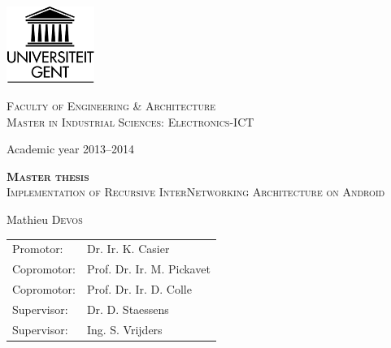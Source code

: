 
\begin{titlepage}

\fontsize{12pt}{14pt}\selectfont

\begin{center}

\includegraphics[height=2.5cm]{figures/ruglogo} 


\vspace{1.7cm}

\fontsize{14pt}{17pt}\selectfont
\textsc{Faculty of Engineering \& Architecture\\Master in Industrial Sciences: Electronics-ICT}
\fontsize{12pt}{14pt}\selectfont
\vspace{0.3cm}

\vspace{1.2cm}

Academic year 2013--2014

\vspace{2.8cm}


\fontsize{17.28pt}{21pt}\selectfont

{\textsc{\textbf{Master thesis}\\Implementation of Recursive InterNetworking Architecture on Android}}

\fontsize{12pt}{14pt}\selectfont

\vspace{2.5cm}

Mathieu \textsc{Devos}	\\

\vspace{1.6cm}

\begin{tabular}{ll}
	Promotor: 	& 	Dr. Ir. K. Casier \\
	Copromotor:		&	 Prof. Dr. Ir. M. Pickavet	\\
	Copromotor: 	&	 Prof. Dr. Ir. D. Colle \\
	Supervisor: 	&		Dr. D. Staessens \\
	Supervisor: 	& 	Ing. S. Vrijders 
\end{tabular}


\vspace{2cm}




\end{center}
\end{titlepage}

\thispagestyle{empty}
